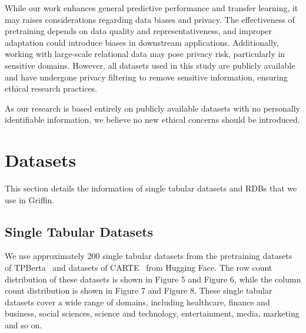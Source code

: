 \documentclass{article}
\theoremstyle{plain}
\theoremstyle{definition}
\theoremstyle{remark}
\begin{document}
While our work enhances general predictive performance and transfer learning, it may raises considerations regarding data biases and privacy. The effectiveness of pretraining depends on data quality and representativeness, and improper adaptation could introduce biases in downstream applications. Additionally, working with large-scale relational data may pose privacy risk, particularly in sensitive domains. However, all datasets used in this study are publicly available and have undergone privacy filtering to remove sensitive information, ensuring ethical research practices.  

As our research is based entirely on publicly available datasets with no personally identifiable information, we believe no new ethical concerns should be introduced.





\newpage
\appendix
\onecolumn
\section{Datasets}
\label{app:datasets}

This section details the information of single tabular datasets and RDBs that we use in Griffin.

\subsection{Single Tabular Datasets}

We use approximately 200 single tabular datasets from the pretraining datasets of TPBerta~\citep{yan2024making} and datasets of CARTE~\cite{kim2024carte} from Hugging Face. The row count distribution of these datasets is shown in Figure 5 and Figure 6, while the column count distribution is shown in Figure 7 and Figure 8. These single tabular datasets cover a wide range of domains, including healthcare, finance and business, social sciences, science and technology, entertainment, media, marketing and so on.
\end{document}
